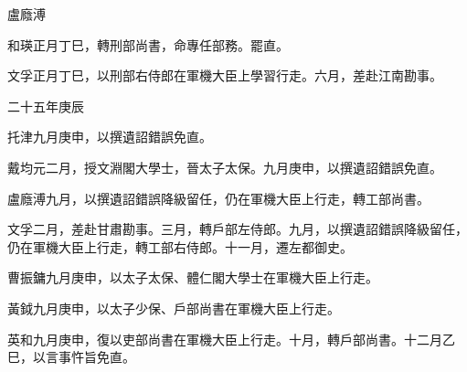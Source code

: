 \begin{pinyinscope}
盧廕溥

和瑛正月丁巳，轉刑部尚書，命專任部務。罷直。

文孚正月丁巳，以刑部右侍郎在軍機大臣上學習行走。六月，差赴江南勘事。

二十五年庚辰

托津九月庚申，以撰遺詔錯誤免直。

戴均元二月，授文淵閣大學士，晉太子太保。九月庚申，以撰遺詔錯誤免直。

盧廕溥九月，以撰遺詔錯誤降級留任，仍在軍機大臣上行走，轉工部尚書。

文孚二月，差赴甘肅勘事。三月，轉戶部左侍郎。九月，以撰遺詔錯誤降級留任，仍在軍機大臣上行走，轉工部右侍郎。十一月，遷左都御史。

曹振鏞九月庚申，以太子太保、體仁閣大學士在軍機大臣上行走。

黃鉞九月庚申，以太子少保、戶部尚書在軍機大臣上行走。

英和九月庚申，復以吏部尚書在軍機大臣上行走。十月，轉戶部尚書。十二月乙巳，以言事忤旨免直。


\end{pinyinscope}